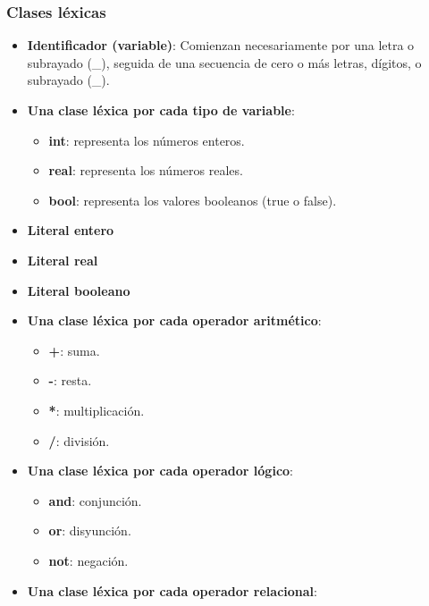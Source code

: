 \documentclass[11pt]{article}
\begin{document}
        \subsubsection*{Clases léxicas}
        \begin{itemize}
            \item \textbf{Identificador (variable)}: Comienzan necesariamente por una letra o subrayado (\_), seguida de una secuencia de cero o más letras, dígitos, o subrayado (\_).
            \item \textbf{Una clase léxica por cada tipo de variable}:
                \begin{itemize}
                    \item \textbf{int}: representa los números enteros.
                    \item \textbf{real}: representa los números reales.
                    \item \textbf{bool}: representa los valores booleanos (true o false).
                \end{itemize}
            \item \textbf{Literal entero}
            \item \textbf{Literal real}
            \item \textbf{Literal booleano}
            \item \textbf{Una clase léxica por cada operador aritmético}:
                \begin{itemize}
                    \item \textbf{+}: suma.
                    \item \textbf{-}: resta.
                    \item \textbf{*}: multiplicación.
                    \item \textbf{/}: división.
                \end{itemize}
            \item \textbf{Una clase léxica por cada operador lógico}:
                \begin{itemize}
                    \item \textbf{and}: conjunción.
                    \item \textbf{or}: disyunción.
                    \item \textbf{not}: negación.
                \end{itemize}
            \item \textbf{Una clase léxica por cada operador relacional}:
                \begin{itemize}

\end{itemize}
\end{itemize}
\end{document}
